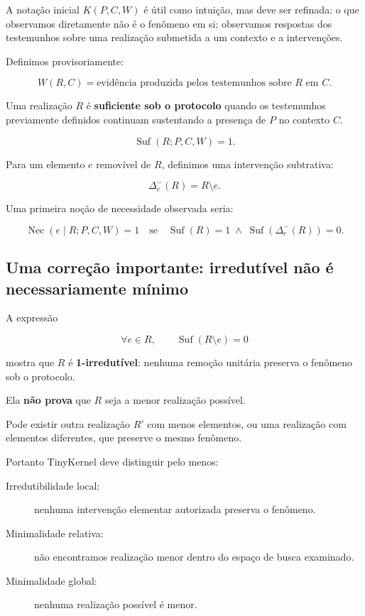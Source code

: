 \documentclass[11pt,a4paper]{article}
\begin{document}
A notação inicial \(K(P,C,W)\) é útil como intuição, mas deve ser refinada:
o que observamos diretamente não é o fenômeno em si; observamos respostas dos
testemunhos sobre uma realização submetida a um contexto e a intervenções.

Definimos provisoriamente:

\[
W(R,C) = \text{evidência produzida pelos testemunhos sobre }R\text{ em }C.
\]

Uma realização \(R\) é \textbf{suficiente sob o protocolo} quando os testemunhos
previamente definidos continuam sustentando a presença de \(P\) no contexto \(C\).

\[
\operatorname{Suf}(R;P,C,W) = 1.
\]

Para um elemento \(e\) removível de \(R\), definimos uma intervenção subtrativa:

\[
\Delta^{-}_{e}(R) = R \setminus e.
\]

Uma primeira noção de necessidade observada seria:

\[
\operatorname{Nec}(e \mid R;P,C,W)
=
1
\quad\text{se}\quad
\operatorname{Suf}(R)=1
\;\land\;
\operatorname{Suf}(\Delta^{-}_{e}(R))=0.
\]

\subsection{Uma correção importante: irredutível não é necessariamente mínimo}

A expressão

\[
\forall e\in R,\qquad
\operatorname{Suf}(R\setminus e)=0
\]

mostra que \(R\) é \textbf{1-irredutível}: nenhuma remoção unitária preserva o
fenômeno sob o protocolo.

Ela \textbf{não prova} que \(R\) seja a menor realização possível.

Pode existir outra realização \(R'\) com menos elementos, ou uma realização com
elementos diferentes, que preserve o mesmo fenômeno.

Portanto TinyKernel deve distinguir pelo menos:

\begin{description}
  \item[Irredutibilidade local:] nenhuma intervenção elementar autorizada preserva o
  fenômeno.
  \item[Minimalidade relativa:] não encontramos realização menor dentro do espaço de
  busca examinado.
  \item[Minimalidade global:] nenhuma realização possível é menor.
\end{description}
\end{document}
